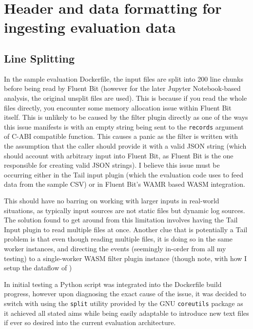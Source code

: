 \section{Header and data formatting for ingesting evaluation data}
\subsection{Line Splitting} \label{splitting}
In the sample evaluation Dockerfile, the input files are split into 200 line chunks before being read by Fluent Bit (however for the later Jupyter Notebook-based analysis, the original unsplit files are used). This is because if you read the whole files directly, you encounter some memory allocation issue within Fluent Bit itself. This is unlikely to be caused by the filter plugin directly as one of the ways this issue manifests is with an empty string being sent to the \texttt{records} argument of C-ABI compatible function. This causes a panic as the filter is written with the assumption that the caller should provide it with a valid JSON string (which should account with arbitrary input into Fluent Bit, as Fluent Bit is the one responsible for creating valid JSON strings). I believe this issue must be occurring either in the Tail input plugin (which the evaluation code uses to feed data from the sample CSV) or in Fluent Bit's WAMR based WASM integration. 

This should have no barring on working with larger inputs in real-world situations, as typically input sources are not static files but dynamic log sources. The solution found to get around from this limitation involves having the Tail Input plugin to read multiple files at once. Another clue that is potentially a Tail problem is that even though reading multiple files, it is doing so in the same worker instances, and directing the events (seemingly in-order from all my testing) to a single-worker WASM filter plugin instance (though note, with how I setup the dataflow of ) 

In initial testing a Python script was integrated into the Dockerfile build progress, however upon diagnosing the exact cause of the issue, it was decided to switch with using the \texttt{split} utility provided by the GNU \texttt{coreutils} package as it achieved all stated aims while being easily adaptable to introduce new text files if ever so desired into the current evaluation architecture.


